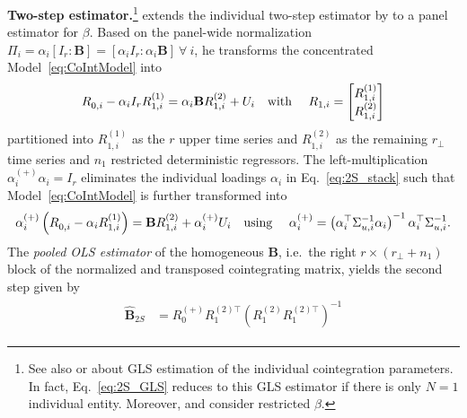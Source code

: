 \textbf{Two-step estimator.}\footnote{See also \citet[Ch.~7.2.2]{Lutkepohl2005} or \citet{BruggemannLutkepohl2005} about GLS estimation of the individual cointegration parameters. In fact, Eq.~\eqref{eq:2S_GLS} reduces to this GLS estimator if there is only $ N=1 $ individual entity. Moreover, \citet[Ch.~7.3.2]{Lutkepohl2005} and \citet[p.~159]{Breitung2005} consider restricted $ \beta $.} 
\citet{Breitung2005} extends the individual two-step estimator by \citet{AhnReisel1990} to a panel estimator for $\beta$. Based on the panel-wide normalization $\Pi_i = \alpha_i \left[I_r : \mathbf{B} \right] = \left[ \alpha_i I_r : \alpha_i \mathbf{B} \right] \ \forall \ i $, he transforms the concentrated Model~\eqref{eq:CoIntModel} into
\begin{align} \label{eq:2S_stack}
\begin{split}
	R^{\ }_{0,i} - \alpha_i I_r R_{1,i}^{(1)} & = \alpha_i \mathbf{B} R_{1,i}^{(2)} + U_{i} \text{\quad with \quad}
	R_{1,i} = \begin{bmatrix} R_{1,i}^{(1)} \\ R_{1,i}^{(2)} \end{bmatrix} \\
\end{split}
\end{align}
partitioned into $ R_{1,i}^{(1)} $ as the $ r $ upper time series and $ R_{1,i}^{(2)} $ as the remaining $ r_\perp $ time series and $ n_1 $ restricted deterministic regressors. The left-multiplication $ \alpha_{i}^{(+)} \alpha_i = I_r $ eliminates the individual loadings $ \alpha_{i} $ in Eq.~\eqref{eq:2S_stack} such that Model~\eqref{eq:CoIntModel} is further transformed into
\begin{align} \label{eq:2S_aux}
\begin{split}
	\alpha_{i}^{(+)} \left(R^{\ }_{0,i} - \alpha_{i} R_{1,i}^{(1)} \right) & = \mathbf{B} R_{1,i}^{(2)} + \alpha_{i}^{(+)} U_{i} \text{\quad using \quad} \alpha_{i}^{(+)} = \left( \alpha_i^\top \Sigma_{u,i}^{-1} \alpha_i \right)^{-1} \alpha_i^\top \Sigma_{u,i}^{-1}. \\
\end{split}
\end{align}
The \textit{pooled OLS estimator} of the homogeneous $ \mathbf{B} $, i.e.~the right $ r \times \left( r_\perp + n_1 \right) $ block of the normalized and transposed cointegrating matrix, yields the second step given by
\begin{align} \label{eq:2S_GLS}
\begin{split}
	\widehat{\mathbf{B}}_{2S} & = R_0^{(+)} R_1^{(2) \top} \left( R_1^{(2)} R_1^{(2) \top} \right)^{-1}
\end{split}
\end{align}

